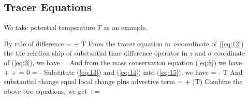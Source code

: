 \subsection{Tracer Equations}
\label{der:tracer-sig}

We take potential temperature $T$ as an example.

By rule of difference
\beeq \label{eq:15}
\dptdt = \pbt{} + T
\eneq
From the tracer equation in $z$-coordinate of (\ref{eq:12}) the the relation ship
of substantial time difference operator in $z$ and $\sigma$ coordinate of
(\ref{eq:3}), we have
\beeq \label{eq:14}
\dtdts = \mqt
\eneq
And from the mass conservation equation (\ref{eq:8}) we have
\beeq
{} + \vv\cdot\gn\pbt + \pbt\divv = 0
\eneq
\beeq \label{eq:13}
 = - \pbt\divv
\eneq
Substitute (\ref{eq:13}) and (\ref{eq:14}) into (\ref{eq:15}), we have
\beeq
\dptdt = \pbt\mqt - T\pbt\divv
\eneq
And substantial change equal local change plus advective term
\beeq
\dptdt = \pptpt + \vv\cdot\gn(\pbt T)
\eneq
Combine the above two equations, we get
\beeq
\pptpt+\divptv = \pbt\mqt
\eneq
